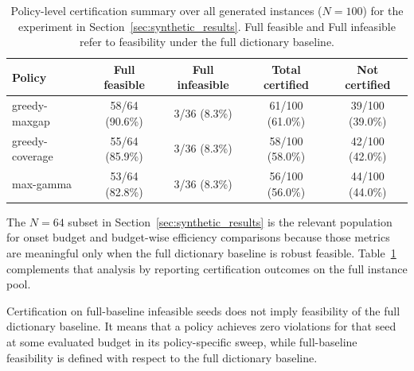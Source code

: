 \documentclass[accepted]{uai2026}
\theoremstyle{plain}
\theoremstyle{definition}
\theoremstyle{remark}
\begin{document}
\begin{table}[!h]
\centering\small
\setlength{\tabcolsep}{4pt}
\caption{Policy-level certification summary over all generated instances ($N=100$) for the experiment in Section~\ref{sec:synthetic_results}. Full feasible and Full infeasible refer to feasibility under the full dictionary baseline.}
\label{tab:all100_context_sec53}
\begin{tabular}{lcccc}
\toprule
Policy & Full feasible & Full infeasible & Total certified & Not certified \\
\midrule
greedy-maxgap   & 58/64 (90.6\%) & 3/36 (8.3\%) & 61/100 (61.0\%) & 39/100 (39.0\%) \\
greedy-coverage & 55/64 (85.9\%) & 3/36 (8.3\%) & 58/100 (58.0\%) & 42/100 (42.0\%) \\
max-gamma       & 53/64 (82.8\%) & 3/36 (8.3\%) & 56/100 (56.0\%) & 44/100 (44.0\%) \\
\bottomrule
\end{tabular}
\end{table}

The $N=64$ subset in Section~\ref{sec:synthetic_results} is the relevant population for onset budget and budget-wise efficiency comparisons because those metrics are meaningful only when the full dictionary baseline is robust feasible. Table~\ref{tab:all100_context_sec53} complements that analysis by reporting certification outcomes on the full instance pool.

Certification on full-baseline infeasible seeds does not imply feasibility of the full dictionary baseline. It means that a policy achieves zero violations for that seed at some evaluated budget in its policy-specific sweep, while full-baseline feasibility is defined with respect to the full dictionary baseline.
\end{document}
